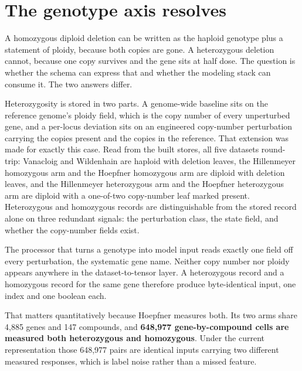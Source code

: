 
\section{The genotype axis resolves}
\label{sec:genotype}

A homozygous diploid deletion can be written as the haploid genotype plus a statement of
ploidy, because both copies are gone. A heterozygous deletion cannot, because one copy
survives and the gene sits at half dose. The question is whether the schema can express that
and whether the modeling stack can consume it. The two answers differ.

Heterozygosity is stored in two parts. A genome-wide baseline sits on the reference genome's
ploidy field, which is the copy number of every unperturbed gene, and a per-locus deviation
sits on an engineered copy-number perturbation carrying the copies present and the copies in
the reference. That extension was made for exactly this case. Read from the built stores,
all five datasets round-trip: Vanacloig and Wildenhain are haploid with deletion leaves,
the Hillenmeyer homozygous arm and the Hoepfner homozygous arm are diploid with deletion
leaves, and the Hillenmeyer heterozygous arm and the Hoepfner heterozygous arm are diploid
with a one-of-two copy-number leaf marked present. Heterozygous and homozygous records are
distinguishable from the stored record alone on three redundant signals: the perturbation
class, the state field, and whether the copy-number fields exist.

The processor that turns a genotype into model input reads exactly one field off every
perturbation, the systematic gene name. Neither copy number nor ploidy appears anywhere in
the dataset-to-tensor layer. A heterozygous record and a homozygous record for the same gene
therefore produce byte-identical input, one index and one boolean each.

That matters quantitatively because Hoepfner measures both. Its two arms share 4{,}885 genes
and 147 compounds, and \textbf{648{,}977 gene-by-compound cells are measured both
heterozygous and homozygous}. Under the current representation those 648{,}977 pairs are
identical inputs carrying two different measured responses, which is label noise rather than
a missed feature.

